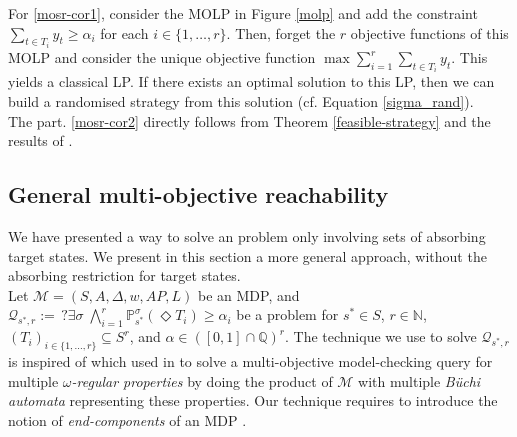 \begin{proof2}
  For \ref{mosr-cor1}, consider the MOLP in Figure \ref{molp} and add the constraint $\sum_{t \in T_i} y_t \geq \alpha_i$ for each $i \in \{1, \dots, r\}$. Then,
  forget the $r$ objective functions of this MOLP and consider the unique objective function $\max \sum_{i=1}^r\sum_{t \in T_i} y_t$.
  This yields a classical LP. If there exists an optimal solution to this LP, then we can
  build a randomised strategy from this solution (cf. Equation \ref{sigma_rand}).\\
  The part. \ref{mosr-cor2} directly follows from Theorem \ref{feasible-strategy} and the results of \cite{DBLP:conf/focs/PapadimitriouY00}. \flushright
\end{proof2}

\subsection{General multi-objective reachability}
We have presented a way to solve an \MOSR{} problem only involving sets of absorbing target states.
We present in this section a more general approach, without the absorbing restriction for target states.\\

Let $\mathcal{M}=(S, A, \Delta, w, AP, L)$ be an MDP, and
$
  \mathcal{Q}_{s^*, r} := \,?\exists \sigma\; \bigwedge_{i=1}^r \mathbb{P}^\sigma_{s^*}(\Diamond T_i) \geq \alpha_i
$
be a \MOSR{} problem for $s^* \in S$, $r \in \mathbb{N}$, $(T_i)_{i \in \{1, \dots, r\}} \subseteq S^r$, and $\alpha \in ([0, 1] \cap \mathbb{Q})^r$.
The technique we use to solve $\mathcal{Q}_{s^*, r}$ is inspired of which used in \cite{DBLP:journals/lmcs/EtessamiKVY08} to solve a multi-objective model-checking query for multiple \textit{$\omega$-regular properties} by doing the product of $\mathcal{M}$ with multiple \textit{Büchi automata} representing these properties.
Our technique requires to introduce the notion of
\textit{end-components} of an MDP \cite{PMC}.

